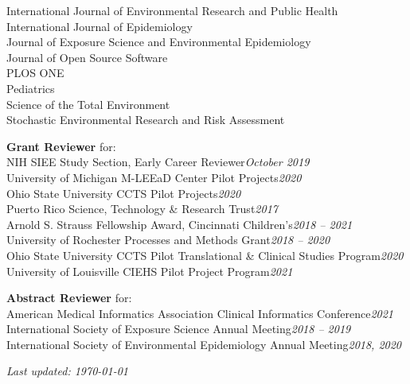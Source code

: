 \documentclass[margin,line]{res}
\newenvironment{list3}{
  \begin{list}{}{%
      \setlength{\itemsep}{0in}
      \setlength{\parsep}{0in} \setlength{\parskip}{0in}
      \setlength{\topsep}{0in} \setlength{\partopsep}{0in}
      \setlength{\leftmargin}{0in}}}{\end{list}}
\begin{document}
\begin{resume}
\begin{list3}
        International Journal of Environmental Research and Public Health \\
        International Journal of Epidemiology \\
        Journal of Exposure Science and Environmental Epidemiology \\
        Journal of Open Source Software \\
        PLOS ONE \\
        Pediatrics \\
        Science of the Total Environment \\
        Stochastic Environmental Research and Risk Assessment
\item[] \textbf{Grant Reviewer} for: \\
        NIH SIEE Study Section, Early Career Reviewer\hfill \textit{October 2019}\\
        University of Michigan M-LEEaD Center Pilot Projects\hfill \textit{2020}\\
        Ohio State University CCTS Pilot Projects\hfill \textit{2020}\\
        Puerto Rico Science, Technology \& Research Trust\hfill \textit{2017}\\
        Arnold S. Strauss Fellowship Award, Cincinnati Children's\hfill \textit{2018 -- 2021}\\
        University of Rochester Processes and Methods Grant\hfill \textit{2018
          -- 2020}\\
        Ohio State University CCTS Pilot Translational \& Clinical Studies
        Program\hfill \textit{2020}\\
        University of Louisville CIEHS Pilot Project Program\hfill \textit{2021}
\item[] \textbf{Abstract Reviewer} for: \\
        American Medical Informatics Association Clinical Informatics Conference\hfill \textit{2021}\\
        International Society of Exposure Science Annual Meeting\hfill \textit{2018 -- 2019}\\
        International Society of Environmental Epidemiology Annual Meeting\hfill \textit{2018, 2020}
\end{list3}

\end{resume}

\vfill

\hfill \textit{Last updated: \today}
\end{document}

